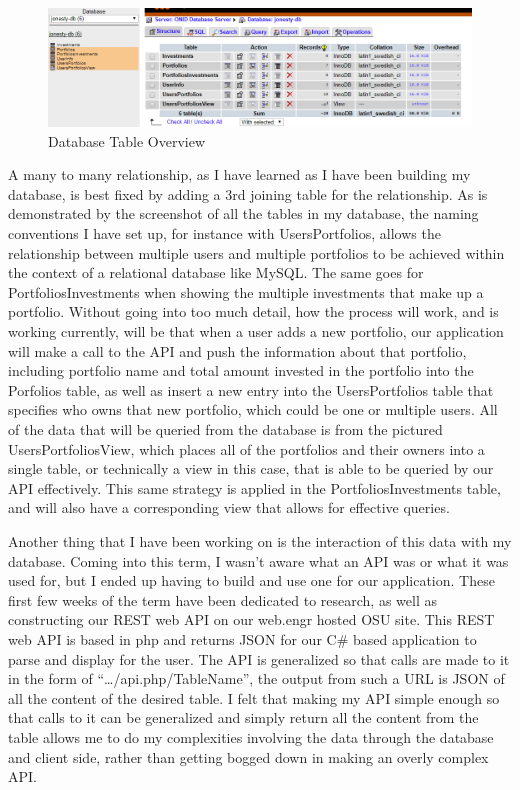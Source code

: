 \documentclass[letterpaper,10pt,titlepage,journal,compsoc,draftclsnofoot,onecolumn]{IEEEtran}
\begin{document}
\begin{figure}[h]
\caption{Database Table Overview}
\centering
\includegraphics[width=\textwidth]{database_screenshot}
\end{figure}
A many to many relationship, as I have learned as I have been building my database, is best fixed by adding a 3rd joining table for the relationship. As is demonstrated by the screenshot of all the tables in my database, the naming conventions I have set up, for instance with UsersPortfolios, allows the relationship between multiple users and multiple portfolios to be achieved within the context of a relational database like MySQL. The same goes for PortfoliosInvestments when showing the multiple investments that make up a portfolio. Without going into too much detail, how the process will work, and is working currently, will be that when a user adds a new portfolio, our application will make a call to the API and push the information about that portfolio, including portfolio name and total amount invested in the portfolio into the Porfolios table, as well as insert a new entry into the UsersPortfolios table that specifies who owns that new portfolio, which could be one or multiple users. All of the data that will be queried from the database is from the pictured UsersPortfoliosView, which places all of the portfolios and their owners into a single table, or technically a view in this case, that is able to be queried by our API effectively. This same strategy is applied in the PortfoliosInvestments table, and will also have a corresponding view that allows for effective queries.

Another thing that I have been working on is the interaction of this data with my database. Coming into this term, I wasn’t aware what an API was or what it was used for, but I ended up having to build and use one for our application. These first few weeks of the term have been dedicated to research, as well as constructing our REST web API on our web.engr hosted OSU site. This REST web API is based in php and returns JSON for our C\# based application to parse and display for the user.  The API is generalized so that calls are made to it in the form of “…/api.php/{TableName}”, the output from such a URL is JSON of all the content of the desired table. I felt that making my API simple enough so that calls to it can be generalized and simply return all the content from the table allows me to do my complexities involving the data  through the database and client side, rather than getting bogged down in making an overly complex API. 
\end{document}
